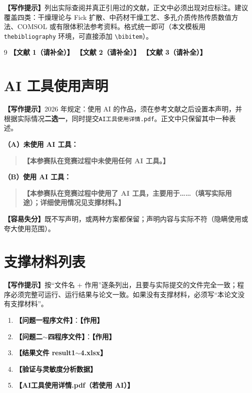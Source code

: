 \documentclass[12pt,a4paper]{article}
\newcommand{\prompt}[1]{\par\noindent\textbf{【写作提示】}#1\par}      %
\newcommand{\pitfall}[1]{\par\noindent\textbf{【容易失分】}#1\par}     %
\newcommand{\ph}[1]{\textbf{【#1】}}                                   %
\begin{document}
\prompt{列出实际查阅并真正引用过的文献，正文中必须出现对应标注。建议覆盖四类：干燥理论与 Fick 扩散、中药材干燥工艺、多孔介质传热传质数值方法、COMSOL 或有限体积法参考资料。格式统一即可（本文模板用 \texttt{thebibliography} 环境，可直接添加 \texttt{\textbackslash bibitem}）。}

\begin{thebibliography}{9}
 \ph{文献 1（请补全）}
 \ph{文献 2（请补全）}
 \ph{文献 3（请补全）}
\end{thebibliography}

\clearpage

\section*{AI 工具使用声明}

\prompt{2026 年规定：使用 AI 的作品，须在参考文献之后设置本声明，并根据实际情况\textbf{二选一}，同时提交\texttt{AI工具使用详情.pdf}。正文中只保留其中一种表述。}

\noindent\textbf{（A）未使用 AI 工具：}

\begin{quote}
\ph{本参赛队在竞赛过程中未使用任何 AI 工具。}
\end{quote}

\noindent\textbf{（B）使用 AI 工具：}

\begin{quote}
\ph{本参赛队在竞赛过程中使用了 AI 工具，主要用于……（填写实际用途）；详细使用情况见支撑材料。}
\end{quote}

\pitfall{既不写声明，或两种方案都保留；声明内容与实际不符（隐瞒使用或夸大使用范围）。}

\clearpage
\appendix

\section{支撑材料列表}

\prompt{按“文件名 + 作用”逐条列出，且要与实际提交的文件完全一致；程序必须完整可运行、运行结果与论文一致。如果没有支撑材料，必须写“本论文没有支撑材料”。}

\begin{enumerate}[label=(\arabic*)]
  \item \ph{问题一程序文件}：\ph{作用}
  \item \ph{问题二$\sim$四程序文件}：\ph{作用}
  \item \ph{结果文件 result1$\sim$4.xlsx}
  \item \ph{验证与灵敏度分析数据}
  \item \ph{AI工具使用详情.pdf（若使用 AI）}
\end{enumerate}
\end{document}
